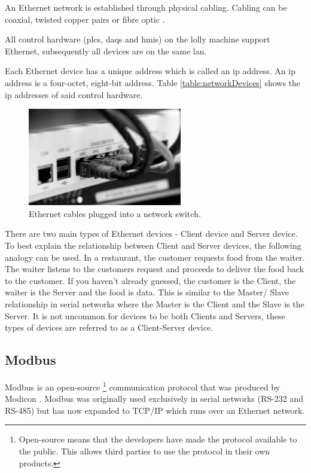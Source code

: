     An Ethernet network is established through physical cabling. Cabling can be coaxial, twisted copper pairs or fibre optic \cite{scott2021networking}.
    
    All control hardware (\acrshort{plc}s, \acrshort{daq}s and \acrshort{hmi}s) on the lolly machine support Ethernet, subsequently all devices are on the same \acrshort{lan}.
    
    Each Ethernet device has a unique address which is called an \acrshort{ip} address. An \acrshort{ip} address is a four-octet, eight-bit address\cite{scott2021networking}. Table \ref{table:networkDevices} shows the \acrshort{ip} addresses of said control hardware. 
    
    \begin{figure}[H]
        \centering
        \includegraphics[width = 0.6\textwidth]{2_images/ethernetCables.png}
        \caption{Ethernet cables plugged into a network switch\cite{scott2021networking}.}
        \label{fig:ethenetCables}
    \end{figure} 

    There are two main types of Ethernet devices - Client device and Server device. To best explain the relationship between Client and Server devices, the following analogy can be used. In a restaurant, the customer requests food from the waiter. The waiter listens to the customers request and proceeds to deliver the food back to the customer. If you haven't already guessed, the customer is the Client, the waiter is the Server and the food is data. This is similar to the Master/ Slave relationship in serial networks where the Master is the Client and the Slave is the Server. It is not uncommon for devices to be both Clients and Servers, these types of devices are referred to as a Client-Server device.

\subsection{Modbus}
    Modbus is an open-source \footnote{Open-source means that the developers have made the protocol available to the public. This allows third parties to use the protocol in their own products.} communication protocol that was produced by Modicon \cite{frenzel2015handbook}. Modbus was originally used exclusively in serial networks (RS-232 and RS-485) but has now expanded to TCP/IP which runs over an Ethernet network\cite{frenzel2015handbook}. 
    

